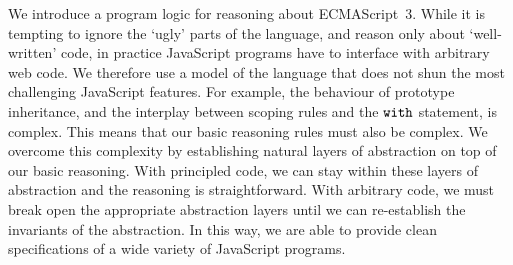 \documentclass{article}
\begin{document}
We introduce a program logic for reasoning about ECMAScript~3. While it is tempting to ignore the `ugly' parts of the language, and reason only about `well-written' code, in practice JavaScript programs have to interface with arbitrary web code.
We therefore use a model of the language that does not shun the most challenging JavaScript features. 
For example, the behaviour of  prototype inheritance,  and the interplay between scoping rules and the $\mbox{\texttt{{\upshape with}}}$ statement, is complex. This means that our basic reasoning rules must also be  complex.  We overcome this complexity by establishing natural layers of abstraction on top of our basic reasoning.  With principled code, we can stay within these layers of abstraction and the reasoning is straightforward.  With arbitrary code, we must break open the appropriate  abstraction layers until we can re-establish the invariants of the abstraction. In this way, we are able to provide clean specifications of a wide variety of JavaScript programs.



%








\end{document}
